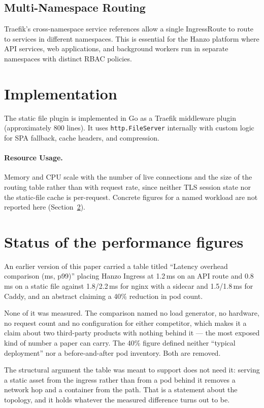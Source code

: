 \documentclass[11pt,twocolumn]{article}
\begin{document}
\subsection{Multi-Namespace Routing}

Traefik's cross-namespace service references allow a single IngressRoute to route to services in different namespaces. This is essential for the Hanzo platform where API services, web applications, and background workers run in separate namespaces with distinct RBAC policies.

\section{Implementation}

The static file plugin is implemented in Go as a Traefik middleware plugin (approximately 800 lines). It uses \texttt{http.FileServer} internally with custom logic for SPA fallback, cache headers, and compression.

\paragraph{Resource Usage.} Memory and CPU scale with the number of live connections and the size of the routing table rather than with request rate, since neither TLS session state nor the static-file cache is per-request. Concrete figures for a named workload are not reported here (Section~\ref{sec:figures}).

\section{Status of the performance figures}
\label{sec:figures}

An earlier version of this paper carried a table titled ``Latency overhead
comparison (ms, p99)'' placing Hanzo Ingress at 1.2\,ms on an API route and
0.8\,ms on a static file against 1.8/2.2\,ms for nginx with a sidecar and
1.5/1.8\,ms for Caddy, and an abstract claiming a 40\% reduction in pod count.

None of it was measured. The comparison named no load generator, no hardware, no
request count and no configuration for either competitor, which makes it a claim
about two third-party products with nothing behind it --- the most exposed kind
of number a paper can carry. The 40\% figure defined neither ``typical
deployment'' nor a before-and-after pod inventory. Both are removed.

The structural argument the table was meant to support does not need it: serving
a static asset from the ingress rather than from a pod behind it removes a
network hop and a container from the path. That is a statement about the
topology, and it holds whatever the measured difference turns out to be.
\end{document}

